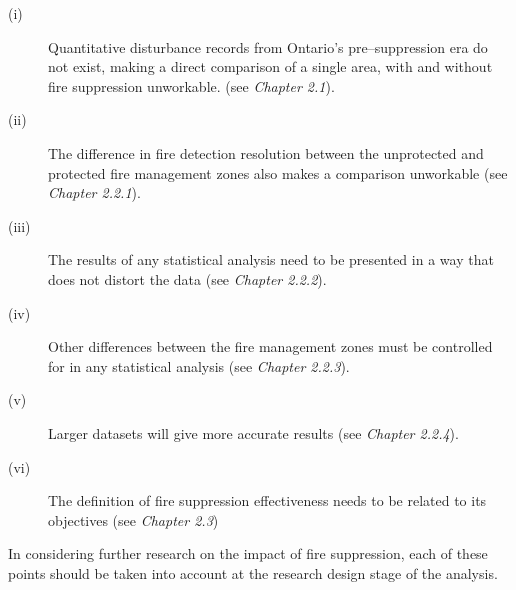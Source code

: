 \begin{spacing}{1.5}
\begin{description}
\item[(i)]
Quantitative disturbance records from Ontario's pre--suppression era do not exist, making a direct comparison of a single area, with and without fire suppression unworkable. (see \emph{Chapter 2.1}).
\item[(ii)]
The difference in fire detection resolution between the unprotected and protected fire management zones also makes a comparison unworkable (see \emph{Chapter 2.2.1}).
\item[(iii)]
The results of any statistical analysis need to be presented in a way that does not distort the data (see \emph{Chapter 2.2.2}).
\item[(iv)]
Other differences between the fire management zones must be controlled for in any statistical analysis (see \emph{Chapter 2.2.3}).
\item[(v)]
Larger datasets will give more accurate results (see \emph{Chapter 2.2.4}).
\item[(vi)]
The definition of fire suppression effectiveness needs to be related to its objectives (see \emph{Chapter 2.3})
\end{description}

\noindent In considering further research on the impact of fire suppression, each of these points should be taken into account at the research design stage of the analysis.

\end{spacing}
\clearpage
